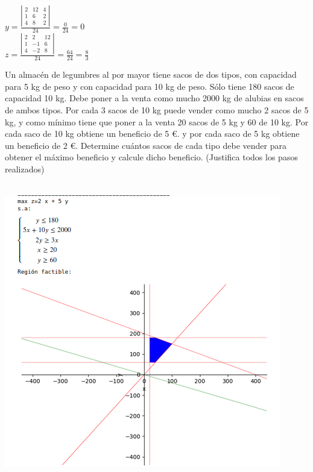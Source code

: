 \documentclass[addpoints,spanish, 12pt,a4paper]{exam}
\begin{document}
\begin{questions}
\begin{parts}
\begin{solution}
$y=\frac{\left|\begin{matrix}2 & 12 & 4\\1 & 6 & 2\\4 & 8 & 2\end{matrix}\right|}{24}=\frac{0}{24}=0$ \\
$z=\frac{\left|\begin{matrix}2 & 2 & 12\\1 & -1 & 6\\4 & -2 & 8\end{matrix}\right|}{24}=\frac{64}{24}=\frac{8}{3}$
\end{solution}
\end{parts}

\question[3] Un almacén de legumbres al por mayor tiene sacos de dos tipos, con
capacidad para 5 kg de peso y con capacidad para 10 kg de peso. Sólo tiene 180 sacos de capacidad
10 kg. Debe poner a la venta como mucho 2000 kg de alubias en sacos de ambos tipos. Por cada
3 sacos de 10 kg puede vender como mucho 2 sacos de 5 kg, y como mínimo tiene que poner a la
venta 20 sacos de 5 kg y 60 de 10 kg. Por cada saco de 10 kg obtiene un beneficio de 5 \euro. y por
cada saco de 5 kg obtiene un beneficio de 2 \euro. Determine cuántos sacos de cada tipo debe vender para obtener el máximo beneficio y calcule dicho beneficio. (Justifica todos los pasos realizados)
\begin{solution}\\
\includegraphics[scale=0.5]{prglin1}\\

\end{solution}
\end{questions}
\end{document}
